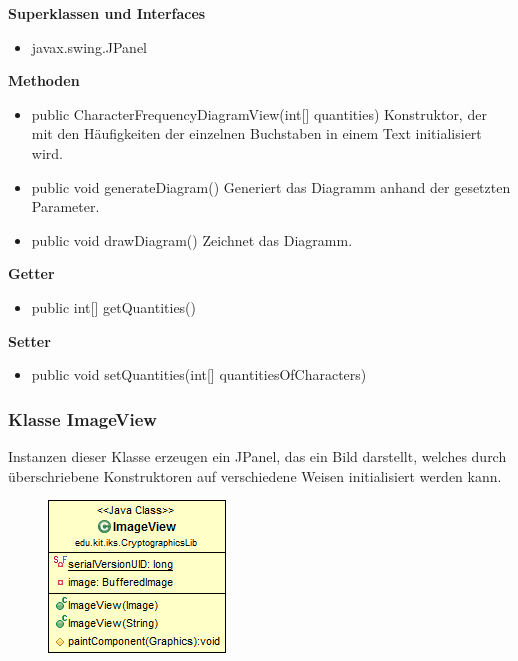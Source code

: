 \documentclass{article}
\begin{document}
      \textbf{Superklassen und Interfaces}
      \begin{itemize}
        \item javax.swing.JPanel
      \end{itemize}
	
      \textbf{Methoden}
      \begin{itemize}
        \item public CharacterFrequencyDiagramView(int[] quantities) \newline
          Konstruktor, der mit den Häufigkeiten der einzelnen Buchstaben in einem Text
          initialisiert wird.
        \item public void generateDiagram() \newline
          Generiert das Diagramm anhand der gesetzten Parameter.
        \item public void drawDiagram() \newline
          Zeichnet das Diagramm.
      \end{itemize}
      
      \textbf{Getter}
      \begin{itemize}
		\item public int[] getQuantities()
      \end{itemize}
      
      \textbf{Setter}
      \begin{itemize}
        \item public void setQuantities(int[] quantitiesOfCharacters)
      \end{itemize}
	
	\subsubsection{Klasse ImageView}
	  Instanzen dieser Klasse erzeugen ein JPanel, das ein Bild darstellt, welches
	  durch überschriebene Konstruktoren auf verschiedene Weisen initialisiert werden kann. 
	
      \begin{figure}[H]
        \centering
        \includegraphics{resources/edu-kit-iks-CryptographicsLib-ImageView}
      \end{figure}
	
\end{document}
